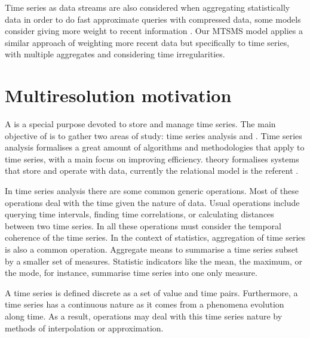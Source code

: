 Time series as data streams are also considered when aggregating
statistically data in order to do fast approximate queries with
compressed data, some models consider giving more weight to recent
information \cite{cormode08:pods}.  Our MTSMS model applies a similar
approach of weighting more recent data but specifically to time
series, with multiple aggregates and considering time irregularities.







\section{Multiresolution motivation}
\label{sec:features}

A  is a special purpose  devoted to store and
manage time series.  The main objective of  is to gather
two areas of study: time series analysis and .  Time series
analysis formalises a great amount of algorithms and methodologies
that apply to time series, with a main focus on improving
efficiency.  theory formalises systems that store and
operate with data, currently the relational model is the referent
\cite{date:introduction}.



In time series analysis there are some common generic operations.
Most of these operations deal with the time given the nature of data.
Usual operations include querying time intervals, finding time
correlations, or calculating distances between two time series. In
all these operations  must consider the temporal coherence
of the time series.  In the context of statistics, aggregation of time
series is also a common operation. Aggregate means to summarise a time
series subset by a smaller set of measures. Statistic indicators like
the mean, the maximum, or the mode, for instance, summarise time
series into one only measure.

A time series is defined discrete as a set of value and time
pairs. Furthermore, a time series has a continuous nature as it comes
from a phenomena evolution along time. As a result, 
operations may deal with this time series nature by methods of
interpolation or approximation.


